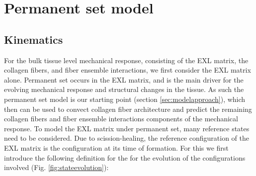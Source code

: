 

\section{Permanent set model}


\subsection{Kinematics}

	For the bulk tissue level mechanical response, consisting of the EXL matrix, the collagen fibers, and fiber ensemble interactions, we first consider the EXL matrix alone. Permanent set occurs in the EXL matrix, and is the main driver for the evolving mechanical response and structural changes in the tissue. As such the permanent set model is our starting point (section \ref{sec:modelapproach}), which then can be used to convect collagen fiber architecture and predict the remaining collagen fibers and fiber ensemble interactions components of the mechanical response. To model the EXL matrix under permanent set, many reference states need to be considered. Due to scission-healing, the reference configuration of the EXL matrix is the configuration at its time of formation. For this we first introduce the following definition for the for the evolution of the configurations involved (Fig. \ref{fig:stateevolution}):

